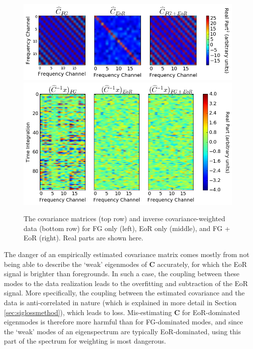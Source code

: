 \documentclass[preprint2,numberedappendix,tighten]{aastex6}  %
\begin{document}
\begin{figure}
	\centering
	\includegraphics[trim={0cm 0cm 0cm 0cm},clip,width=\columnwidth]{plots/toy_sigloss12.png}
	\includegraphics[trim={0cm 0cm 0cm 0cm},clip,width=\columnwidth]{plots/toy_sigloss13.png}
	\caption{The covariance matrices (top row) and inverse covariance-weighted data (bottom row) for FG only (left), EoR only 
(middle), and FG + EoR (right). Real parts are shown here.}
	\label{fig:toy_sigloss12}
\end{figure}

The danger of an empirically estimated covariance matrix comes mostly from not being able to describe the `weak' eigenmodes of $
\textbf{C}$ accurately, for which the EoR signal is brighter than foregrounds. In such a case, the coupling between these modes to the data realization leads to the overfitting and subtraction of the EoR signal. More specifically, the coupling between the estimated covariance and the data is anti-correlated in nature (which is explained in more detail in Section \ref{sec:siglossmethod}), which leads to loss. Mis-estimating $\textbf{C}$ for EoR-dominated eigenmodes is therefore more harmful than for FG-dominated modes, and since the `weak' modes of an eigenspectrum are typically EoR-dominated, using this part of the spectrum for weighting is most dangerous.
\end{document}
